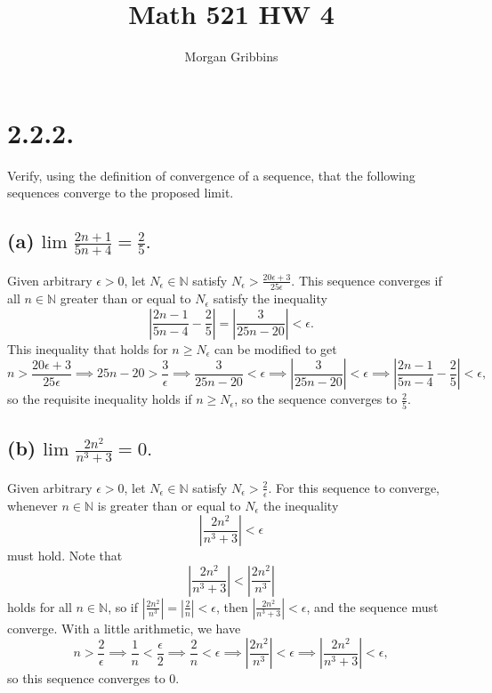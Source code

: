 \documentclass[12pt,letterpaper]{article}
\title{Math 521 HW 4}
\author{Morgan Gribbins}
\date{}
\begin{document}
	
\maketitle

\section*{2.2.2.}
Verify, using the definition of convergence of a sequence, that the following sequences converge to the proposed limit.

\subsection*{(a) \(\text{lim } \frac{2n+1}{5n+4} = \frac{2}{5}.\)} 

Given arbitrary \(\epsilon > 0\), let \(N_{\epsilon} \in \mathbb{N}\) satisfy \(N_{\epsilon} > \frac{20\epsilon + 3}{25\epsilon}\). This sequence converges if all \(n \in \mathbb{N}\) greater than or equal to \(N_{\epsilon}\) satisfy the inequality \[\left|\frac{2n-1}{5n-4} - \frac{2}{5}\right| = \left| \frac{3}{25n-20} \right| < \epsilon.\] This inequality that holds for \(n \geq N_{\epsilon}\) can be modified to get \[n > \frac{20\epsilon + 3}{25\epsilon} \implies 25n - 20 > \frac{3}{\epsilon} \implies \frac{3}{25n - 20} < \epsilon \implies \left|\frac{3}{25n - 20}\right| < \epsilon \implies \left| \frac{2n-1}{5n-4} - \frac{2}{5} \right| < \epsilon,\] so the requisite inequality holds if \(n \geq N_{\epsilon}\), so the sequence converges to \(\frac{2}{5}\).

\subsection*{(b) \(\text{lim } \frac{2n^{2}}{n^{3} + 3} = 0.\)}

Given arbitrary \(\epsilon > 0\), let \(N_{\epsilon} \in \mathbb{N}\) satisfy \(N_{\epsilon} > \frac{2}{\epsilon}\). For this sequence to converge, whenever \(n \in \mathbb{N}\) is greater than or equal to \(N_{\epsilon}\) the inequality \[\left|\frac{2n^{2}}{n^{3}+3}\right| < \epsilon\] must hold. Note that \[\left|\frac{2n^{2}}{n^{3}+3}\right| < \left|\frac{2n^{2}}{n^{3}}\right|\] holds for all \(n \in \mathbb{N}\), so if \(\left|\frac{2n^{2}}{n^{3}}\right| = \left|\frac{2}{n}\right| < \epsilon\), then \(\left|\frac{2n^{2}}{n^{3} + 3}\right| < \epsilon\), and the sequence must converge. With a little arithmetic, we have \[n > \frac{2}{\epsilon} \implies \frac{1}{n} < \frac{\epsilon}{2} \implies \frac{2}{n} < \epsilon \implies \left|\frac{2n^{2}}{n^{3}}\right| < \epsilon \implies \left|\frac{2n^{2}}{n^{3} + 3}\right| < \epsilon,\] so this sequence converges to \(0\).
\end{document}
